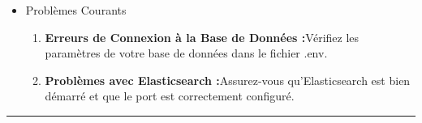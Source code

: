 \documentclass[12pt]{article}
\begin{document}
            \begin{itemize}
                \item Problèmes Courants
                \begin{enumerate}
                    \item \textbf{Erreurs de Connexion à la Base de Données :}Vérifiez les paramètres de votre base de données dans le fichier .env.
                    \item \textbf{Problèmes avec Elasticsearch :}Assurez-vous qu'Elasticsearch est bien démarré et que le port est correctement configuré.
                \end{enumerate}
            \end{itemize}
        \rule{linewidth}{0.3pt}
        
        
\end{document}
